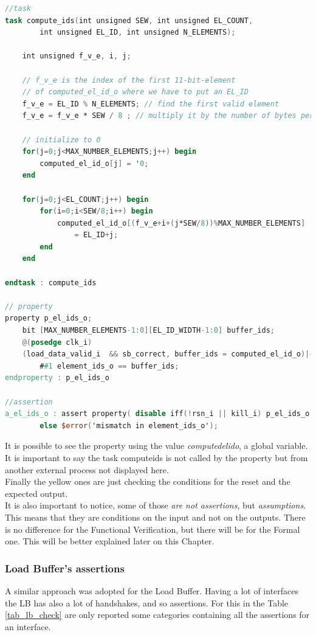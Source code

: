 \newpage
\linespread{1}
\begin{lstlisting}[language=Verilog,style=verilog-style, backgroundcolor=\color{lyel_palette}, frame=tlb]
//task
task compute_ids(int unsigned SEW, int unsigned EL_COUNT, 
	    int unsigned EL_ID, int unsigned N_ELEMENTS);

    int unsigned f_v_e, i, j;
		
    // f_v_e is the index of the first 11-bit-element 
    // of computed_el_id_o where we have to put an EL_ID
	f_v_e = EL_ID % N_ELEMENTS; // find the first valid element 
	f_v_e = f_v_e * SEW / 8 ; // multiply it by the number of bytes per el
		
	// initialize to 0
	for(j=0;j<MAX_NUMBER_ELEMENTS;j++) begin
	    computed_el_id_o[j] = '0;
	end

	for(j=0;j<EL_COUNT;j++) begin
		for(i=0;i<SEW/8;i++) begin
			computed_el_id_o[(f_v_e+i+(j*SEW/8))%MAX_NUMBER_ELEMENTS] 
			    = EL_ID+j;
		end
	end

endtask : compute_ids

// property
property p_el_ids_o;
	bit [MAX_NUMBER_ELEMENTS-1:0][EL_ID_WIDTH-1:0] buffer_ids;
	@(posedge clk_i)
	(load_data_valid_i  && sb_correct, buffer_ids = computed_el_id_o)|-> 
        ##1 element_ids_o == buffer_ids;
endproperty : p_el_ids_o

//assertion
a_el_ids_o : assert property( disable iff(!rsn_i || kill_i) p_el_ids_o ) 
        else $error('mismatch in element_ids_o');
\end{lstlisting}
\linespread{1.2}
\bigskip

It is possible to see the property using the value \textit{computed\+el\+id\+o}, a global variable. It is important to say the task compute\+ids is not called by the property but from another external process not displayed here.\\

Finally the yellow ones are just checking the conditions for the reset and the expected output.\\

It is also important to notice, some of those \textit{are not assertions}, but \textit{assumptions}. This means that they are conditions on the input and not on the outputs. There is no difference for the Functional Verification, but there will be for the Formal one. This will be better explained later on this Chapter.\\



\subsubsection{Load Buffer's assertions}
A similar approach was adopted for the Load Buffer. Having a lot of interfaces the LB has also a lot of handshakes, and so assertions. For this in the Table \ref{tab_lb_check} are only reported some categories containing all the assertions for an interface.\\


